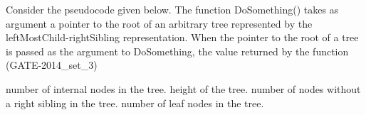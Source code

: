 \begin{questyle}
  \question  Consider the pseudocode given below. The function DoSomething() takes as argument a pointer
             to the root of an arbitrary tree represented by the leftMostChild-rightSibling representation. When
             the pointer to the root of a tree is passed as the argument to DoSomething, the value returned by
             the function (GATE-2014\_set\_3)
              
  \begin{choices}
    \choice         number of internal nodes in the tree.
    \choice         height of the tree.
    \choice         number of nodes without a right sibling in the tree.
    \CorrectChoice  number of leaf nodes in the tree.
  \end{choices}
\end{questyle}
